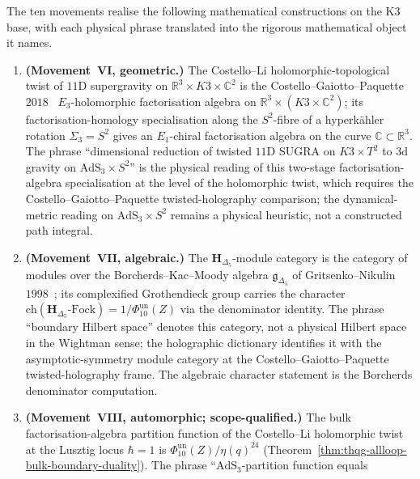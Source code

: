 \begin{remark}
\label{rem:3dgravvix-1}
The ten movements realise the following mathematical constructions on
the K3 base, with each physical phrase translated into the
rigorous mathematical object it names.
\begin{enumerate}[label=\textup{(\Roman*)}]
\item \textbf{(Movement~VI, geometric.)} The Costello--Li
 holomorphic-topological twist of $11$D supergravity on
 $\mathbb{R}^3 \times K3 \times \mathbb{C}^2$ is the
 Costello--Gaiotto--Paquette $2018$~\cite{CostelloGaiottoPaquette2018}
 $E_3$-holomorphic factorisation algebra on $\mathbb{R}^3 \times
 (K3 \times \mathbb{C}^2)$; its factorisation-homology
 specialisation along the $S^2$-fibre of a hyperk\"ahler rotation
 $\Sigma_3 = S^2$ gives an $E_1$-chiral factorisation algebra on
 the curve $\mathbb{C} \subset \mathbb{R}^3$. The phrase
 ``dimensional reduction of twisted $11$D SUGRA on $K3 \times T^2$
 to $3$d gravity on $\mathrm{AdS}_3 \times S^2$'' is the physical
 reading of this two-stage factorisation-algebra specialisation at
 the level of the holomorphic twist, which requires the
 Costello--Gaiotto--Paquette twisted-holography comparison; the
 dynamical-metric reading on $\mathrm{AdS}_3 \times S^2$ remains a
 physical heuristic, not a constructed path integral.
\item \textbf{(Movement~VII, algebraic.)} The
 $\mathbf{H}_{\Delta_5}$-module category is the category of
 modules over the Borcherds--Kac--Moody algebra
 $\mathfrak{g}_{\Delta_5}$ of Gritsenko--Nikulin
 $1998$~\cite{GritsenkoNikulin1998}; its complexified Grothendieck
 group carries the character
 $\mathrm{ch}(\mathbf{H}_{\Delta_5}\text{-Fock})
 = 1/\Phi_{10}^{\mathrm{un}}(Z)$
 via the denominator identity. The phrase ``boundary Hilbert
 space'' denotes this category, not a physical Hilbert space in the
 Wightman sense; the holographic dictionary identifies it with the
 asymptotic-symmetry module category at the
 Costello--Gaiotto--Paquette twisted-holography frame.
 The algebraic character statement is the Borcherds denominator
 computation.
\item \textbf{(Movement~VIII, automorphic; scope-qualified.)} The
 bulk factorisation-algebra partition function of the Costello--Li
 holomorphic twist at the Lusztig locus $\hbar = 1$ is
 $\Phi_{10}^{\mathrm{un}}(Z)/\eta(q)^{24}$
 (Theorem~\ref{thm:thqg-allloop-bulk-boundary-duality}). The phrase
 ``$\mathrm{AdS}_3$-partition function equals

\end{enumerate}
\end{remark}
